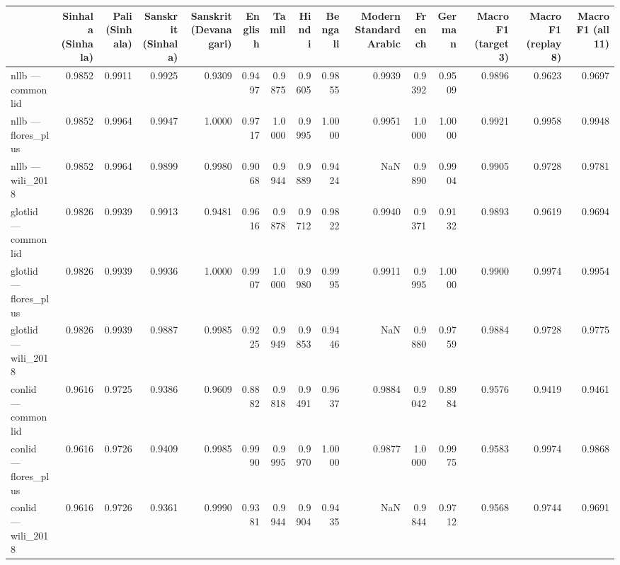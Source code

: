 \begin{tabular}{lrrrrrrrrrrrrrr}
\toprule
 & Sinhala (Sinhala) & Pali (Sinhala) & Sanskrit (Sinhala) & Sanskrit (Devanagari) & English & Tamil & Hindi & Bengali & Modern Standard Arabic & French & German & Macro F1 (target 3) & Macro F1 (replay 8) & Macro F1 (all 11) \\
\midrule
nllb — commonlid & 0.9852 & 0.9911 & 0.9925 & 0.9309 & 0.9497 & 0.9875 & 0.9605 & 0.9855 & 0.9939 & 0.9392 & 0.9509 & 0.9896 & 0.9623 & 0.9697 \\
nllb — flores\_plus & 0.9852 & 0.9964 & 0.9947 & 1.0000 & 0.9717 & 1.0000 & 0.9995 & 1.0000 & 0.9951 & 1.0000 & 1.0000 & 0.9921 & 0.9958 & 0.9948 \\
nllb — wili\_2018 & 0.9852 & 0.9964 & 0.9899 & 0.9980 & 0.9068 & 0.9944 & 0.9889 & 0.9424 & NaN & 0.9890 & 0.9904 & 0.9905 & 0.9728 & 0.9781 \\
glotlid — commonlid & 0.9826 & 0.9939 & 0.9913 & 0.9481 & 0.9616 & 0.9878 & 0.9712 & 0.9822 & 0.9940 & 0.9371 & 0.9132 & 0.9893 & 0.9619 & 0.9694 \\
glotlid — flores\_plus & 0.9826 & 0.9939 & 0.9936 & 1.0000 & 0.9907 & 1.0000 & 0.9980 & 0.9995 & 0.9911 & 0.9995 & 1.0000 & 0.9900 & 0.9974 & 0.9954 \\
glotlid — wili\_2018 & 0.9826 & 0.9939 & 0.9887 & 0.9985 & 0.9225 & 0.9949 & 0.9853 & 0.9446 & NaN & 0.9880 & 0.9759 & 0.9884 & 0.9728 & 0.9775 \\
conlid — commonlid & 0.9616 & 0.9725 & 0.9386 & 0.9609 & 0.8882 & 0.9818 & 0.9491 & 0.9637 & 0.9884 & 0.9042 & 0.8984 & 0.9576 & 0.9419 & 0.9461 \\
conlid — flores\_plus & 0.9616 & 0.9726 & 0.9409 & 0.9985 & 0.9990 & 0.9995 & 0.9970 & 1.0000 & 0.9877 & 1.0000 & 0.9975 & 0.9583 & 0.9974 & 0.9868 \\
conlid — wili\_2018 & 0.9616 & 0.9726 & 0.9361 & 0.9990 & 0.9381 & 0.9944 & 0.9904 & 0.9435 & NaN & 0.9844 & 0.9712 & 0.9568 & 0.9744 & 0.9691 \\
\bottomrule
\end{tabular}

